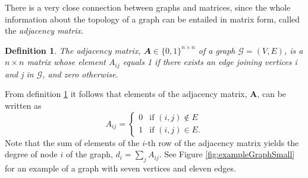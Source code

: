 \documentclass[12pt]{article}
\numberwithin{equation}{section}
\newtheorem{definition}[theorem]{Definition}
\begin{document}
There is a very close connection between graphs and matrices, since the whole information about the topology of a graph can be entailed in matrix form, called the \textsl{adjacency matrix}.
\begin{definition}
	\label{def:adjacencyMatrix}
	The adjacency matrix, $\mathbfit{A} \in \{0,1\}^{n \times n}$ of a graph $\mathcal{G} = (V,E)$, is a $n\times n$ matrix whose element $A_{ij}$ equals 1 if there exists an edge joining vertices i and j in $\mathcal{G}$, and zero otherwise.
\end{definition}
From definition \ref{def:adjacencyMatrix} it follows that elements of the adjacency matrix, $\mathbf{A}$, can be written as
\begin{equation*}
	A_{ij} =
	\begin{cases}
		0 & \text{if } (i,j) \not\in E\\
		1 & \text{if } (i,j) \in E.
	\end{cases}
\end{equation*}
Note that the sum of elements of the $i$-th row of the adjacency matrix yields the degree of node $i$ of the graph, $d_{i} = \sum\limits_{j} A_{ij}$. See Figure \ref{fig:exampleGraphSmall} for an example of a graph with seven vertices and eleven edges.

\end{document}
